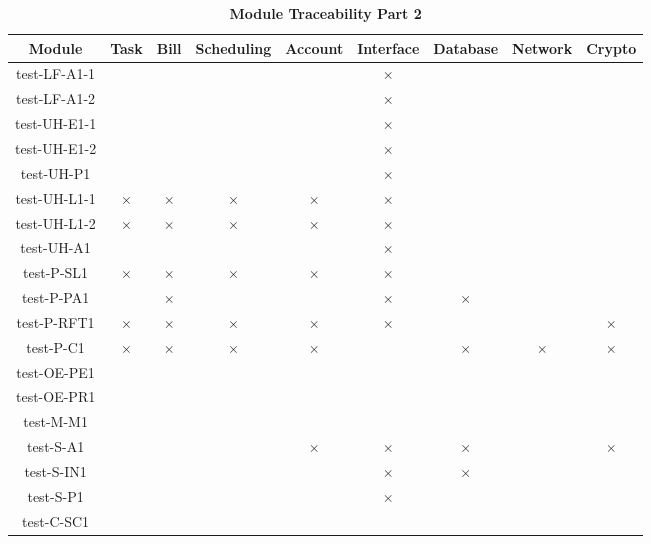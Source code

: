 \documentclass[12pt, titlepage]{article}
\begin{document}
\begin{table}[H]
\centering
\hspace*{-1cm}
\begin{tabular}{|c|c|c|c|c|c|c|c|c|}
\hline
Module & Task & Bill & Scheduling & Account & Interface & Database & Network & Crypto \\
\hline 
test-LF-A1-1 & & & & & $\times$  & & &   \\
test-LF-A1-2 & & & & & $\times$  & & &   \\
test-UH-E1-1 & & & & & $\times$  & & &   \\
test-UH-E1-2 & & & & & $\times$  & & &   \\
test-UH-P1 & & & & & $\times$  & & &   \\
test-UH-L1-1 & $\times$ & $\times$ & $\times$ & $\times$ & $\times$  & & &   \\
test-UH-L1-2 & $\times$ & $\times$ & $\times$ & $\times$ & $\times$  & & &   \\
test-UH-A1 & & & & & $\times$  & & &   \\
test-P-SL1 & $\times$ & $\times$ & $\times$ & $\times$ & $\times$  & & &   \\
test-P-PA1 &  & $\times$ & & & $\times$  & $\times$  &  &   \\
test-P-RFT1 & $\times$  & $\times$  & $\times$ & $\times$ & $\times$ &  &  & $\times$  \\
test-P-C1 & $\times$ & $\times$  & $\times$  & $\times$  & & $\times$  & $\times$  & $\times$    \\
test-OE-PE1 &  &  & & & & & &   \\
test-OE-PR1 &  &  &  & & & & &   \\
test-M-M1 &  & & &  & & & &   \\
test-S-A1 &  &  & & $\times$  & $\times$   & $\times$  & & $\times$    \\
test-S-IN1 &  &  & & &  $\times$   & $\times$ & &   \\
test-S-P1 &  &  & & &   $\times$ &  &  &   \\
test-C-SC1 &  &  & & &    &  &  &  \\
\hline
\end{tabular}
\caption{\bf Module Traceability Part 2}
\end{table}

\end{document}
